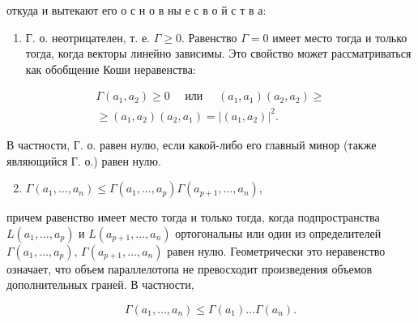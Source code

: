 \documentclass[10pt]{article}
\begin{document}
откуда и вытекают его о с н о в ны е с в о й с т в а:



\begin{enumerate}

  \item Г. о. неотрицателен, т. е. $\Gamma \geqslant 0$. Равенство $\Gamma=0$ имеет место тогда и только тогда, когда векторы линейно зависимы. Это свойство может рассматриваться как обобщение Коши неравенства:

\end{enumerate}



\[

\begin{gathered}

\Gamma\left(a_{1}, a_{2}\right) \geqslant 0 \quad \text { или } \quad\left(a_{1}, a_{1}\right)\left(a_{2}, a_{2}\right) \geqslant \\

\geqslant\left(a_{1}, a_{2}\right)\left(a_{2}, a_{1}\right)=\left|\left(a_{1}, a_{2}\right)\right|^{2} .

\end{gathered}

\]



В частности, Г. о. равен нулю, если какой-либо его главный минор (также являющийся Г. о.) равен нулю.



\begin{enumerate}

  \setcounter{enumi}{1}

  \item $\Gamma\left(a_{1}, \ldots, a_{n}\right) \leqslant \Gamma\left(a_{1}, \ldots, a_{p}\right) \Gamma\left(a_{p+1}, \ldots, a_{n}\right)$,

\end{enumerate}



причем равенство имеет место тогда и только тогда, когда подпространства $L\left(a_{1}, \ldots, a_{p}\right)$ и $L\left(a_{p+1}, \ldots, a_{n}\right)$ ортогональны или один из определителей $\Gamma\left(a_{1}, \ldots, a_{p}\right)$, $\Gamma\left(a_{p+1}, \ldots, a_{n}\right)$ равен нулю. Геометрически это неравенство означает, что объем параллелотопа не превосходит произведения объемов дополнительных граней. В частности,



\[

\Gamma\left(a_{1}, \ldots, a_{n}\right) \leqslant \Gamma\left(a_{1}\right) \ldots \Gamma\left(a_{n}\right) .

\]
\end{document}

